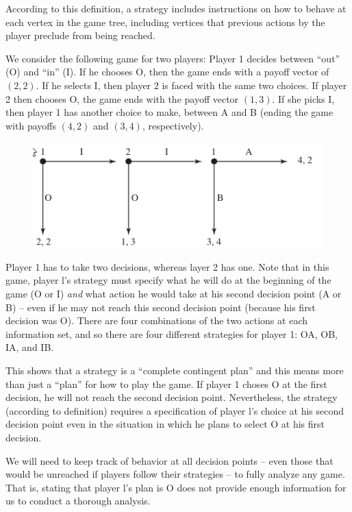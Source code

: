 According to this definition, a strategy includes instructions on how to behave at each vertex in the game tree, including vertices that previous actions by the player preclude from being reached.

We consider the following game for two players: Player 1 decides between “out” (O) and “in” (I). If he chooses O, then the game ends with a payoff vector of $(2, 2)$. If he selects I, then player 2 is faced with the same two choices. If player 2 then chooses O, the game ends with the payoff vector $(1, 3)$. If she picks I, then player 1 has another choice to make, between A and B (ending the game with payoffs $(4, 2)$ and $(3, 4)$, respectively). 

\begin{figure}[H]
    \centering
    \includegraphics[scale=0.7]{images/2023-10-10-game_theory_02a.png}
\end{figure}

Player 1 has to take two decisions, whereas layer 2 has one. Note that in this game, player l’s strategy must specify what he will do at the beginning of the game (O or I) \emph{and} what action he would take at his second decision point (A or B) -- even if he may not reach this second decision point (because his first decision was O). There are four combinations of the two actions at each information set, and so there are four different strategies for player 1: OA, OB, IA, and IB.

This shows that a strategy is a  “complete contingent plan” and this means more than just a “plan” for how to play the game. If player 1 choses O at the first decision, he will not reach the second decision point. Nevertheless, the strategy (according to definition) requires a specification of player l’s choice at his second decision point even in the situation in which he plans to select O at his first decision.

We will need to keep track of behavior at all decision points -- even those that would be unreached if players follow their strategies -- to fully analyze any game. That is, stating that player l’s plan is O does not provide enough information for us to conduct a thorough analysis.



